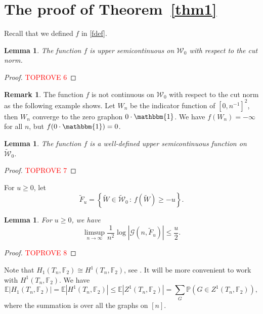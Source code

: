 \documentclass[11pt,a4paper]{article}
\theoremstyle{plain}
\newtheorem{lemma}[theorem]{Lemma}
\theoremstyle{definition}
\newtheorem{remark}[theorem]{Remark}
\begin{document}
\section{The proof of Theorem~\ref{thm1}}
Recall that we defined $f$ in \eqref{fdef}.

\begin{lemma}\label{semic0}
The function $f$ is upper semicontinuous on $\mathcal{W}_0$ with respect to the cut norm.
\end{lemma}
\begin{proof}\textcolor{red}{TOPROVE 6}\end{proof}

\begin{remark} The function $f$ is not continuous on $\mathcal{W}_0$ with respect to the cut norm as the following example shows. Let $W_n$ be the indicator function of $[0,n^{-1}]^2$, then $W_n$ converge to the zero graphon $0\cdot \mathbbm{1}$. We have $f(W_n)=-\infty$ for all $n$, but $f(0\cdot \mathbbm{1})=0$. 
\end{remark}
\begin{lemma}\label{semic}
The function $f$ is a well-defined upper semicontinuous function on $\widetilde{\mathcal{W}}_0$.
\end{lemma}
\begin{proof}\textcolor{red}{TOPROVE 7}\end{proof}


For $u\ge 0$, let
\[\widetilde{F}_u=\left\{\widetilde{W}\in \widetilde{\mathcal{W}}_0\,:\,f(\widetilde{W})\ge -u\right\}.\]

\begin{lemma}\label{LDFu}
For $u\ge 0$, we have
\[\limsup_{n\to\infty} \frac{1}{n^2}\log |\mathcal{G}(n,\widetilde{F}_u)|\le \frac{u}2.\]

\end{lemma}
\begin{proof}\textcolor{red}{TOPROVE 8}\end{proof}

Note that $H_1(T_n,\mathbb{F}_2)\cong H^1(T_n,\mathbb{F}_2)$, see \cite[Chapter 3.1]{hatcher2000algebraic}. It will be more convenient to work with $H^1(T_n,\mathbb{F}_2)$. We have
\begin{equation}\label{Eh1}\mathbb{E} |H_1(T_n,\mathbb{F}_2)|=\mathbb{E} |H^1(T_n,\mathbb{F}_2)|\le \mathbb{E} |Z^1(T_n,\mathbb{F}_2)|=\sum_G \mathbb{P}\left(G\in Z^1(T_n,\mathbb{F}_2)\right),\end{equation}
where the summation is over all the graphs on $[n]$.
\end{document}
